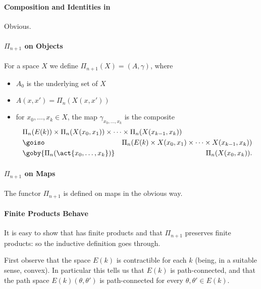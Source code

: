 \paragraph{Composition and Identities in }

Obvious.

\paragraph{$\Pi_{n+1}$ on Objects}

For a space $X$ we define $\Pi_{n+1}(X) = (A,\gamma)$, where 
%
\begin{itemize}
\item $A_0$ is the underlying set of $X$
\item $A(x,x') = \Pi_n(X(x,x'))$
\item for $x_0, \ldots, x_k \in X$, the map $\gamma_{x_0, \ldots, x_k}$ is the
composite 
%
\begin{eqnarray*}
\lefteqn{\Pi_n(E(k)) \times \Pi_n(X(x_0,x_1)) \times\cdots\times
\Pi_n(X(x_{k-1},x_k))} 							\\
	&\goiso	&\Pi_n(E(k) \times X(x_0,x_1) \times\cdots\times
		 X(x_{k-1},x_k))					\\
	&\goby{\Pi_n(\act{x_0,\ldots,x_k})}
		&\Pi_n(X(x_0,x_k)).
\end{eqnarray*}
\end{itemize}

\paragraph{$\Pi_{n+1}$ on Maps}

The functor $\Pi_{n+1}$ is defined on maps in the obvious way.

\paragraph{Finite Products Behave}

It is easy to show that  has finite products and that
$\Pi_{n+1}$ preserves finite products: so the inductive definition goes
through. 



\clearpage




First observe that the space $E(k)$ is contractible for each $k$ (being, in a
suitable sense, convex).  In particular this tells us that $E(k)$ is
path-connected, and that the path space $E(k)(\theta,\theta')$ is
path-connected for every $\theta, \theta' \in E(k)$.


